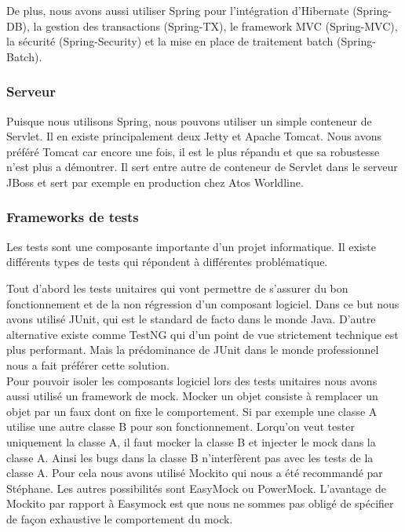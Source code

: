 De plus, nous avons aussi utiliser Spring pour l'intégration d'Hibernate (Spring-DB), la gestion des transactions (Spring-TX), le framework MVC (Spring-MVC), la sécurité (Spring-Security) et la mise en place de traitement batch (Spring-Batch). 

\subsubsection{Serveur}

Puisque nous utilisons Spring, nous pouvons utiliser un simple conteneur de Servlet. Il en existe principalement deux Jetty et Apache Tomcat. Nous avons préféré Tomcat car encore une fois, il est le plus répandu et que sa robustesse n'est plus a démontrer. Il sert entre autre de conteneur de Servlet dans le serveur JBoss et sert par exemple en production chez Atos Worldline. 

\subsubsection{Frameworks de tests}

Les tests sont une composante importante d'un projet informatique. Il existe différents types de tests qui répondent à différentes problématique.

Tout d'abord les tests unitaires qui vont permettre de s'assurer du bon fonctionnement et de la non régression d'un composant logiciel. Dans ce but nous avons utilisé JUnit, qui est le standard de facto dans le monde Java. D'autre alternative existe comme TestNG qui d'un point de vue strictement technique est plus performant. Mais la prédominance de JUnit dans le monde professionnel nous a fait préférer cette solution.\\

Pour pouvoir isoler les composants logiciel lors des tests unitaires nous avons aussi utilisé un framework de mock. Mocker un objet consiste à remplacer un objet par un faux dont on fixe le comportement. Si par exemple une classe A utilise une autre classe B pour son fonctionnement. Lorqu'on veut tester uniquement la classe A, il faut mocker la classe B et injecter le mock dans la classe A. Ainsi les bugs dans la classe B n'interfèrent pas avec les tests de la classe A. Pour cela nous avons utilisé Mockito qui nous a été recommandé par Stéphane. Les autres possibilités sont EasyMock ou PowerMock. L'avantage de Mockito par rapport à Easymock est que nous ne sommes pas obligé de spécifier de façon exhaustive le comportement du mock.\\

